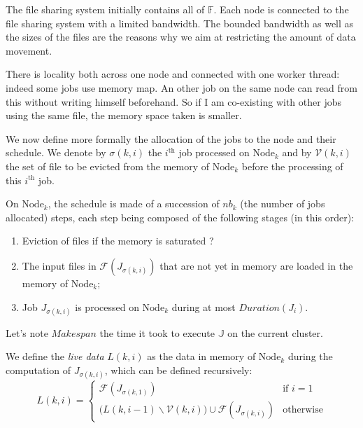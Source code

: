 \documentclass[a4paper]{article}
\newcommand{\Node}[1]{\ensuremath{\mathrm{Node}_{#1}}\xspace}
\newcommand{\inputs}{\ensuremath{\mathcal{F}}\xspace}
\newcommand{\duration}{\mathit{Duration}\xspace}
\newcommand{\fileset}{\ensuremath{\mathbb{F}}\xspace}
\newcommand{\jobset}{\ensuremath{\mathbb{J}}\xspace}
\newcommand{\evict}{\ensuremath{\mathcal{V}}\xspace}
\newcommand{\live}{\ensuremath{L}\xspace}
\begin{document}
The file sharing system initially contains all of $\fileset$.
Each node is connected to the file sharing system with a limited bandwidth.
The bounded bandwidth as well as the sizes of the files are the reasons why
we aim at restricting the amount of data movement.


There is locality both across one node and connected with one worker thread:
indeed some jobs use memory map. An other job on the same node can read from this without writing himself beforehand. 
So if I am co-existing with other jobs using the same file, the memory space taken is smaller.

We now define more formally the allocation of the jobs to the node and
their schedule.
We denote by $\sigma(k,i)$ the $i^\text{th}$ job
processed on $\Node{k}$ and by $\evict(k,i)$ the set of file to
be evicted from the memory of $\Node{k}$ before the processing
of this $i^\text{th}$ job.

On $\Node{k}$, the schedule is made of a
succession of $\mathit{nb}_k$ (the number of jobs allocated) steps, each step being composed of the
following stages (in this order):
\begin{enumerate}
\item Eviction of files if the memory is saturated ? 
\item The input files in $\inputs(J_{\sigma(k,i)})$ that are not yet in memory are loaded in the memory of $\Node{k}$;
\item Job $J_{\sigma(k,i)}$ is processed on $\Node{k}$ during at most $\duration(J_i)$.
\end{enumerate}
Let's note $\mathit{Makespan}$ the time it took to execute $\jobset$ on the current cluster.

We define the \emph{live data} $\live(k,i)$
as the data in memory of $\Node{k}$ during the computation of $J_{\sigma(k,i)}$, which
can be defined recursively:
$$
\live(k,i)=
\begin{cases}
  \inputs(J_{\sigma(k,1)}) & \text{if~}i=1\\
\Big(\live(k,i-1) \backslash \evict(k,i)\Big) \cup \inputs(J_{\sigma(k,i)})
& \text{otherwise}
\end{cases}
$$
\end{document}
